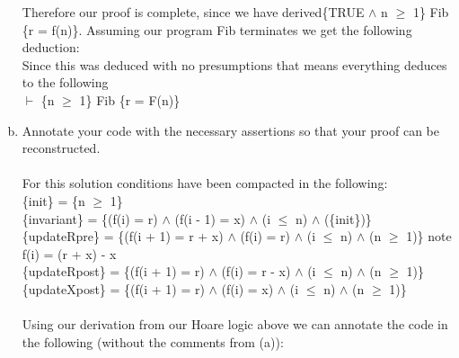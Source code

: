 \documentclass{article}
\newcommand*\moveToRight[1]{\hspace*{0em plus 1fill}\makebox{(#1)}}
\begin{document}
\begin{enumerate}[(a)]
    Therefore our proof is complete, since we have derived\{TRUE $\land$ n $\geq$ 1\} Fib \{r = f(n)\}. Assuming our program Fib terminates we get the following deduction:\\ Since this was deduced with no presumptions that means everything deduces to the following\\
    \hspace*{150pt}$\vdash$ \{n $\geq$ 1\} Fib \{r = F(n)\}
    \newpage
    \item Annotate your code with the necessary assertions so that your proof can be reconstructed. \moveToRight{3 marks}\\\\
   For this solution conditions have been compacted in the following:\\ \{init\} = \{n $\geq$ 1\}\\
    \{invariant\} = \{(f(i) = r) $\land$ (f(i - 1) = x) $\land$ (i $\leq$ n) $\land$ (\{init\})\}\\
    \{updateRpre\} = \{(f(i + 1) = r + x) $\land$ (f(i) = r) $\land$ (i $\leq$ n) $\land$ (n $\geq$ 1)\} note f(i) = (r + x) - x\\
    \{updateRpost\} =  \{(f(i + 1) = r) $\land$ (f(i) = r - x) $\land$ (i  $\leq$ n) $\land$ (n $\geq$ 1)\}\\
    \{updateXpost\} =  \{(f(i + 1) = r) $\land$ (f(i) = x) $\land$  (i $\leq$ n) $\land$ (n $\geq$ 1)\}\\\\  
    Using our derivation from our Hoare logic above we can annotate the code in the following (without the comments from (a)):\\

\end{enumerate}
\end{document}
